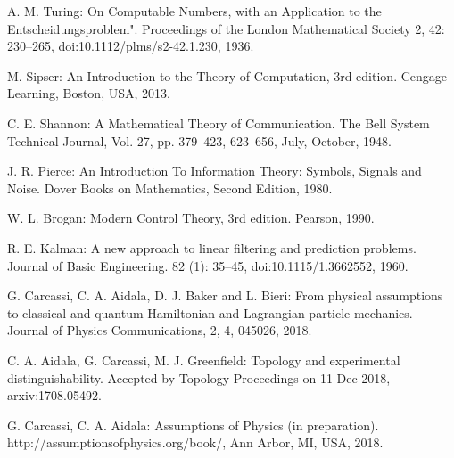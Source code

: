 \documentclass[letterpaper]{article}
\theoremstyle{plain}%
\theoremstyle{definition}
\theoremstyle{remark}
\numberwithin{equation}{section}
\begin{document}
\begin{thebibliography}{1}
	
	A. M. Turing: On Computable Numbers, with an Application to the Entscheidungsproblem". Proceedings of the London Mathematical Society 2, 42: 230–265, doi:10.1112/plms/s2-42.1.230, 1936. 
	
	 M. Sipser: An Introduction to the Theory of Computation, 3rd edition. Cengage Learning, Boston, USA, 2013.
	
	 C. E. Shannon: A Mathematical Theory of Communication. The Bell System Technical Journal,
	Vol. 27, pp. 379–423, 623–656, July, October, 1948.
	
	 J. R. Pierce: An Introduction To Information Theory: Symbols, Signals and Noise. Dover Books on Mathematics, Second Edition, 1980.
	
	 W. L. Brogan: Modern Control Theory, 3rd edition. Pearson, 1990. 	
	
	 R. E. Kalman: A new approach to linear filtering and prediction problems. Journal of Basic Engineering. 82 (1): 35–45, doi:10.1115/1.3662552, 1960.
	
	 G. Carcassi, C. A. Aidala, D. J. Baker and L. Bieri: From physical assumptions to classical and quantum Hamiltonian and Lagrangian particle mechanics. Journal of Physics Communications, 2, 4, 045026, 2018.
	
	 C. A. Aidala, G. Carcassi, M. J. Greenfield: Topology and experimental distinguishability. Accepted by Topology Proceedings on 11 Dec 2018, arxiv:1708.05492.
	
	 G. Carcassi, C. A. Aidala: Assumptions of Physics (in preparation). http://assumptionsofphysics.org/book/, Ann Arbor, MI, USA, 2018.
\end{thebibliography}
\end{document}
